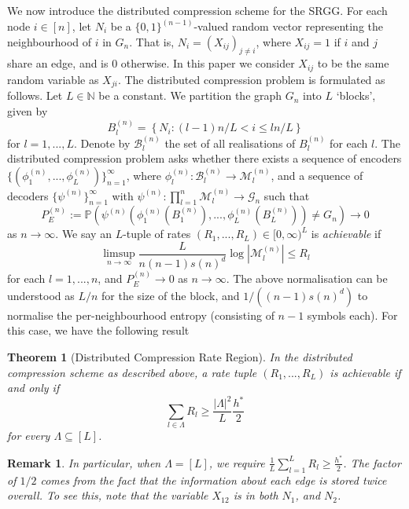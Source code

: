 \documentclass[conference,letterpaper]{IEEEtran}
\newtheorem{theorem}{Theorem}
\newtheorem{remark}{Remark}
\newcommand{\tti}{\rightarrow\infty}
\newcommand{\graph}{\mathcal{G}}
\newcommand{\prob}[1]{\mathbb{P}\left(#1\right)}
\begin{document}
We now introduce the distributed compression scheme for the SRGG. For each node $i \in [n]$, let $N_i$ be a $\{0,1\}^{(n-1)}$-valued random vector representing the neighbourhood of $i$ in $G_n$. That is, $N_i = (X_{ij})_{j \neq i}$, where $X_{ij} = 1$ if $i$ and $j$ share an edge, and is $0$ otherwise. In this paper we consider $X_{ij}$ to be the same random variable as $X_{ji}$. The distributed compression problem is formulated as follows. Let $L \in \mathbb{N}$ be a constant. We partition the graph $G_n$ into $L$ `blocks', given by
\begin{equation}
    B^{(n)}_{l} = \left\{N_i : (l-1)n/L < i \leq ln/L\right\}
\end{equation}
for $l = 1,...,L$. Denote by $\mathcal{B}_l^{(n)}$ the set of all realisations of $B^{(n)}_l$ for each $l$. The distributed compression problem asks whether there exists a sequence of encoders $\{(\phi_1^{(n)},...,\phi_L^{(n)})\}_{n=1}^\infty$, where $\phi_l^{(n)} : \mathcal{B}_l^{(n)} \to \mathcal{M}_l^{(n)}$, and a sequence of decoders $\{\psi^{(n)}\}_{n=1}^\infty$ with $\psi^{(n)}: \prod_{l=1}^n\mathcal{M}_l^{(n)} \to \graph_n$ such that
\begin{equation*}
    P_E^{(n)} := \prob{\psi^{(n)}(\phi_1^{(n)}(B^{(n)}_1),...,\phi_L^{(n)}(B^{(n)}_L)) \neq G_n} \to 0
\end{equation*}
as $n\tti$. We say an $L$-tuple of rates $(R_1,...,R_L) \in [0,\infty)^{L}$ is \textit{achievable} if 
\begin{equation*}
    \limsup_{n\tti} \frac{L}{n(n-1)s(n)^d} \log |\mathcal{M}_l^{(n)}| \leq R_l
\end{equation*}
for each $l=1,...,n$, and $P_E^{(n)} \to 0$ as $n\tti$. The above normalisation can be understood as $L/n$ for the size of the block, and $1/((n-1)s(n)^d)$ to normalise the per-neighbourhood entropy (consisting of $n-1$ symbols each). For this case, we have the following result
\begin{theorem}[Distributed Compression Rate Region]
    \label{thm:partial_dsc}
    In the distributed compression scheme as described above, a rate tuple $(R_1,...,R_L)$ is achievable if and only if
    \begin{equation}
        \sum_{l \in \Lambda} R_l \geq \frac{|\Lambda|^2}{L}\frac{h^*}{2} 
    \end{equation}
    for every $\Lambda \subseteq [L]$.
\end{theorem}
\begin{remark}
    In particular, when $\Lambda = [L]$, we require $\frac{1}{L}\sum_{l=1}^L R_l \geq \frac{h^*}{2}$. The factor of $1/2$ comes from the fact that the information about each edge is stored twice overall. To see this, note that the variable $X_{12}$ is in both $N_1$, and $N_2$. 
\end{remark}
\end{document}
